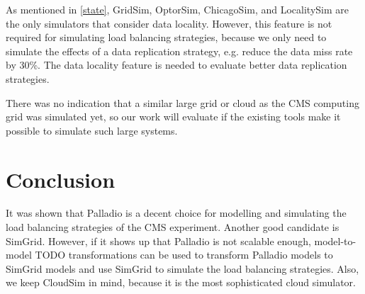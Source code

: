 As mentioned in \cref{state}, GridSim, OptorSim, ChicagoSim, and LocalitySim are the only simulators that consider data locality. However, this feature is not required for simulating load balancing strategies, because we only need to simulate the effects of a data replication strategy, e.g. reduce the data miss rate by 30\%. The data locality feature is needed to evaluate better data replication strategies. 

There was no indication that a similar large grid or cloud as the CMS computing grid was simulated yet, so our work will evaluate if the existing tools make it possible to simulate such large systems.


\begin{center}
\label{compare}
\end{center}

\chapter{Conclusion}

It was shown that Palladio is a decent choice for modelling and simulating  the load balancing strategies of the CMS experiment. Another good candidate is SimGrid. However, if it shows up that Palladio is not scalable enough, model-to-model TODO transformations can be used to transform Palladio models to SimGrid models and use SimGrid to simulate the load balancing strategies. Also, we keep CloudSim in mind, because it is the most sophisticated cloud simulator.

